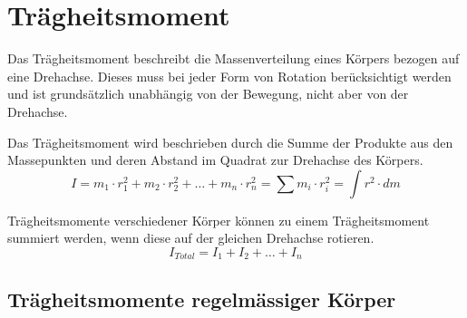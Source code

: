\section{Trägheitsmoment}\label{sec:traegheitsmoment}
Das Trägheitsmoment beschreibt die Massenverteilung eines Körpers
bezogen auf eine Drehachse. Dieses muss bei jeder Form von Rotation
berücksichtigt werden und ist grundsätzlich unabhängig von der 
Bewegung, nicht aber von der Drehachse.

Das Trägheitsmoment wird beschrieben durch die Summe der 
Produkte aus den Massepunkten und deren Abstand im Quadrat zur 
Drehachse des Körpers.
\[ \boxed{
	I = m_1 \cdot r_1^2
		+ m_2 \cdot r_2^2 
		+ \dots 
		+ m_n \cdot r_n^2
		= \sum m_i \cdot r_i^2
		= \int r^2 \cdot dm
} \]

\noindent
Trägheitsmomente verschiedener Körper können zu einem Trägheitsmoment
summiert werden, wenn diese auf der gleichen Drehachse rotieren.
\[ \boxed{
	I_{Total} = I_1 + I_2 + \dots + I_n
} \]

\newpage
\subsection{Trägheitsmomente regelmässiger Körper}

